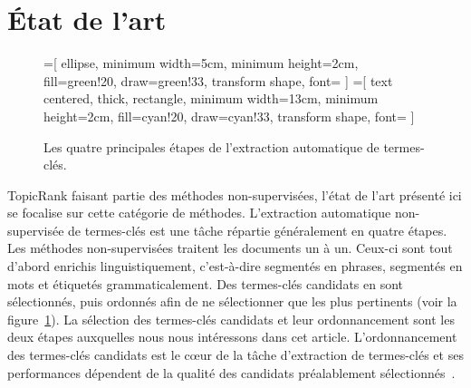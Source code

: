 \section{État de l'art}
\label{sec:etat_de_l_art}
  \begin{figure}
    =[
      ellipse,
      minimum width=5cm,
      minimum height=2cm,
      fill=green!20,
      draw=green!33,
      transform shape,
      font={\huge}
    ]
    =[
      text centered,
      thick,
      rectangle,
      minimum width=13cm,
      minimum height=2cm,
      fill=cyan!20,
      draw=cyan!33,
      transform shape,
      font={\huge\bfseries}
    ]

    \centering
    \caption{Les quatre principales étapes de l'extraction automatique de
             termes-clés. \label{fig:etapes_de_l_extraction_de_termes_cles}}
  \end{figure}
  TopicRank faisant partie des méthodes non-supervisées, l'état de l'art
  présenté ici se focalise sur cette catégorie de méthodes. L'extraction
  automatique non-supervisée de termes-clés est une tâche répartie généralement
  en quatre étapes. Les méthodes non-supervisées traitent les documents un à un.
  Ceux-ci sont tout d'abord enrichis linguistiquement, c'est-à-dire segmentés en
  phrases, segmentés en mots  et étiquetés grammaticalement. Des termes-clés
  candidats en sont sélectionnés, puis ordonnés afin de ne sélectionner que les
  plus pertinents (voir la
  figure~\ref{fig:etapes_de_l_extraction_de_termes_cles}). La sélection des
  termes-clés candidats et leur ordonnancement sont les deux étapes auxquelles
  nous nous intéressons dans cet article. L'ordonnancement des termes-clés
  candidats est le c\oe{}ur de la tâche d'extraction de termes-clés et ses
  performances dépendent de la qualité des candidats préalablement
  sélectionnés~\cite{wang2014keyphraseextractionpreprocessing}.

